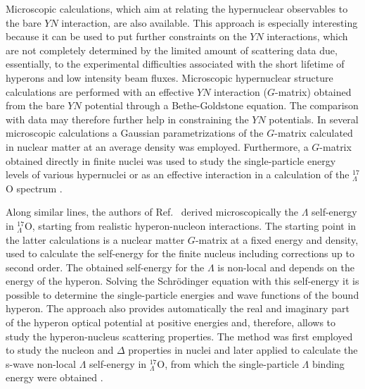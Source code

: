Microscopic calculations, which aim at relating the hypernuclear
observables to the bare $YN$ interaction, are also available. This
approach is especially interesting because it can be used to put
further constraints on the $YN$ interactions, which are not completely
determined by the limited amount of scattering data due, essentially,
to the
experimental difficulties associated with the short lifetime of hyperons
and low intensity beam fluxes. Microscopic hypernuclear structure
calculations are performed with an effective $YN$ interaction ($G$-matrix)
obtained from the bare $YN$ potential through a
Bethe-Goldstone equation. The comparison with data may therefore further help in
constraining the $YN$ potentials.
In several microscopic calculations a Gaussian
parametrizations of the $G$-matrix calculated in nuclear matter at an
average density \cite{yama85,yama90,yama92,yama94} was employed. 
Furthermore, a $G$-matrix obtained directly in finite nuclei was used to
study the single-particle energy levels of various hypernuclei
\cite{hald93} or as an effective interaction in a calculation of the 
$^{17}_{\Lambda}$O spectrum \cite{hao93}.

Along similar lines, the authors of Ref.\ \cite{hjort96}
derived microscopically  the $\Lambda$ self-energy in $^{17}_{\Lambda}$O,
starting from realistic hyperon-nucleon interactions. 
The starting point in the latter calculations 
is a nuclear matter $G$-matrix at a fixed
energy and density, used to calculate the self-energy for the
finite nucleus including corrections up to second order. 
The obtained self-energy for the $\Lambda$ 
is non-local and depends on the energy of the hyperon. Solving
the Schr\"{o}dinger equation with this self-energy it is possible to 
determine the single-particle energies and wave functions of the bound
hyperon. The approach also provides automatically
the real and imaginary part of the hyperon optical potential
at positive energies and, therefore,
allows to study the hyperon-nucleus scattering properties.
The method was first
employed to study the nucleon and $\Delta$ properties in nuclei
\cite{bbmp92,hmp94} and later applied to calculate the s-wave
non-local $\Lambda$ self-energy in $^{17}_{\Lambda}$O, 
from which the single-particle
$\Lambda$ binding energy were obtained \cite{hjort96}.

